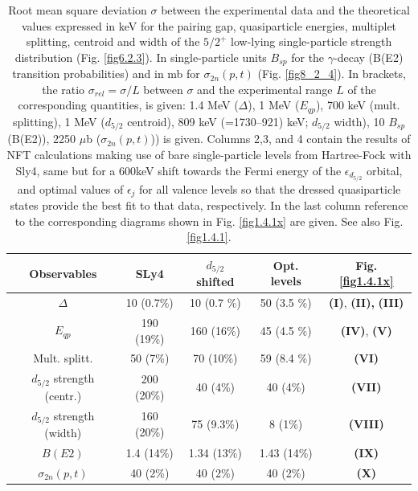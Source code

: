  \begin{table}
\begin{center}
\begin{tabular}{|c|c|c|c|c|}
\hline
  Observables  &  SLy4 &  $d_{5/2}$ shifted  & Opt. levels& Fig. \ref{fig1.4.1x} \\ 
\hline
$\Delta$ &  10  (0.7\%) &  10  (0.7 \%) & 50   (3.5 \%)&\textbf{(I)}, \textbf{(II),} \textbf{(III)}\\
 $E_{qp}$ & 190 (19\%)  & 160  (16\%)   & 45  (4.5 \%)& \textbf{(IV)}, \textbf{(V)}\\
 Mult.  splitt. & 50  (7\%) & 70  (10\%)    & 59  (8.4 \%)& \textbf{(VI)}\\
  $d_{5/2}$ strength (centr.) & 200  (20\%)  & 40  (4\%)   & 40  (4\%)& \textbf{(VII)} \\
$d_{5/2}$ strength (width) & 160  (20\%)  &75  (9.3\%)  &  8  (1\%)& \textbf{(VIII)}\\
$B(E2)$ & 1.4  (14\%) & 1.34  (13\%)   & 1.43  (14\%)& \textbf{(IX)}\\ 
$\sigma_{2n}(p,t)$ & 40 (2\%) & 40 (2\%) & 40 (2\%) &\textbf{(X)}\\
 \hline
\end{tabular}
\caption{Root  mean square deviation $\sigma$ between  the experimental data and the theoretical values expressed in keV for the pairing gap, quasiparticle energies, multiplet splitting, centroid and width of the  
$5/2^+$ low-lying single-particle strength distribution (Fig. \ref{fig6.2.3}). In single-particle units $B_{sp}$ for the $\gamma$-decay  (B(E2) transition probabilities) and in mb for $\sigma_{2n}(p,t)$ (Fig. \ref{fig8_2_4}). In brackets, 
the ratio $\sigma_{rel}=\sigma/L$ between $\sigma$ and the experimental  range $L$ of the corresponding quantities, is given: 1.4 MeV ($\Delta$), 1 MeV ($E_{qp}$), 700 keV (mult. splitting), 
1 MeV ($d_{5/2}$ centroid),  809 keV (=1730--921) keV;  $d_{5/2}$ width), 10 $B_{sp}$ (B(E2)), 2250 $\mu$b ($\sigma_{2n}(p,t)$)) is given. Columns 2,3, and 4 contain the results of NFT calculations making use of bare single-particle levels from Hartree-Fock with Sly4, same but for a 600keV shift towards the Fermi energy of the $\epsilon_{d_{5/2}}$ orbital, and optimal values of $\epsilon_j$ for all valence levels so that the dressed quasiparticle states provide the best fit to that data, respectively. In the last column reference to the corresponding diagrams shown in Fig. \ref{fig1.4.1x} are given. See also Fig. \ref{fig1.4.1}.}
\label{tab1.4.1}
\end{center}
\end{table}



